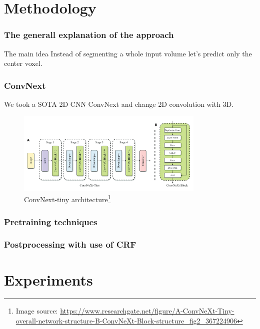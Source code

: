 \documentclass{beamer}
\begin{document}
\section{Methodology}

\begin{frame}
    \frametitle{The generall explanation of the approach}
    \begin{block}{The main idea}
        Instead of segmenting a whole input volume let's predict only the center voxel.
    \end{block}
\end{frame}

\begin{frame}
    \frametitle{ConvNext}
    We took a SOTA 2D CNN ConvNext\cite{liu2022convnet} and change 2D convolution with 3D.
    \begin{figure}
        \includegraphics[width=0.8\textwidth]{convnext.png}
        \caption{ConvNext-tiny architecture\footnote{Image source: \url{https://www.researchgate.net/figure/A-ConvNeXt-Tiny-overall-network-structure-B-ConvNeXt-Block-structure_fig2_367224906}}}
    \end{figure}
\end{frame}

\begin{frame}
    \frametitle{Pretraining techniques}



\end{frame}

\begin{frame}
    \frametitle{Postprocessing with use of CRF}
\end{frame}

\section{Experiments}
\end{document}
